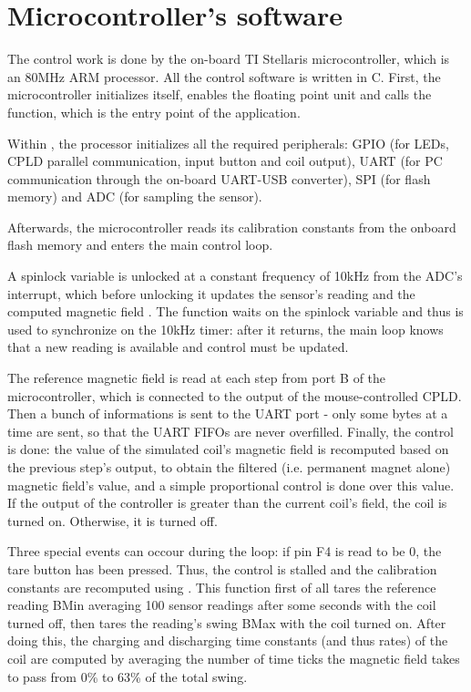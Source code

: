 \section{Microcontroller's software}
The control work is done by the on-board TI Stellaris microcontroller, which is an 80MHz ARM processor. All the control software is written in C.
First, the microcontroller initializes itself, enables the floating point unit and calls the  function, which is the entry point of the application.

Within , the processor initializes all the required peripherals: GPIO (for LEDs, CPLD parallel communication, input button and coil output), UART (for PC communication through the on-board UART-USB converter), SPI (for flash memory) and ADC (for sampling the sensor).

Afterwards, the microcontroller reads its calibration constants from the onboard flash memory and enters the main control loop.

A spinlock variable is unlocked at a constant frequency of 10kHz from the ADC's interrupt, which before unlocking it updates the sensor's reading  and the computed magnetic field . The  function waits on the spinlock variable and thus is used to synchronize on the 10kHz timer: after it returns, the main loop knows that a new reading is available and control must be updated.

The reference magnetic field is read at each step from port B of the microcontroller, which is connected to the output of the mouse-controlled CPLD. Then a bunch of informations is sent to the UART port - only some bytes at a time are sent, so that the UART FIFOs are never overfilled. Finally, the control is done: the value of the simulated coil's magnetic field is recomputed based on the previous step's output, to obtain the filtered (i.e. permanent magnet alone) magnetic field's value, and a simple proportional control is done over this value. If the output of the controller is greater than the current coil's field, the coil is turned on. Otherwise, it is turned off.

Three special events can occour during the loop: if pin F4 is read to be 0, the tare button has been pressed. Thus, the control is stalled and the calibration constants are recomputed using . This function first of all tares the reference reading BMin averaging 100 sensor readings after some seconds with the coil turned off, then tares the reading's swing BMax with the coil turned on. After doing this, the charging and discharging time constants (and thus rates) of the coil are computed by averaging the number of time ticks the magnetic field takes to pass from 0\% to 63\% of the total swing.


